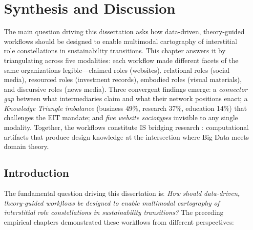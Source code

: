 \documentclass[../main.tex]{subfiles}
\begin{document}
\chapter{Synthesis and Discussion}
\margintoc


\begin{chapteroverview}
The main question driving this dissertation asks how data-driven, theory-guided workflows should be designed to enable multimodal cartography of interstitial role constellations in sustainability transitions. This chapter answers it by triangulating across five modalities: each workflow made different facets of the same organizations legible---claimed roles (websites), relational roles (social media), resourced roles (investment records), embodied roles (visual materials), and discursive roles (news media). Three convergent findings emerge: a \emph{connector gap} between what intermediaries claim and what their network positions enact; a \emph{Knowledge Triangle imbalance} (business 49\%, research 37\%, education 14\%) that challenges the EIT mandate; and \emph{five website sociotypes} invisible to any single modality. Together, the workflows constitute IS bridging research \parencite{maass2018data}: computational artifacts that produce design knowledge at the intersection where Big Data meets domain theory.
\end{chapteroverview}

\section{Introduction}

The fundamental question driving this dissertation is: \emph{How should data-driven, theory-guided workflows be designed to enable multimodal cartography of interstitial role constellations in sustainability transitions?} The preceding empirical chapters demonstrated these workflows from different perspectives:
\end{document}
